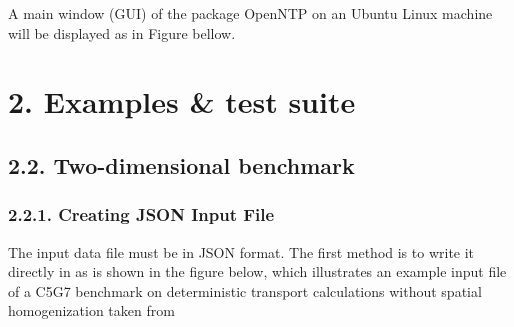 \documentclass[letterpaper,10pt,english]{sphinxmanual}
\begin{document}
A main window (GUI) of the package OpenNTP on an Ubuntu Linux machine will be displayed as in Figure bellow.

\noindent{}


\section{2. Examples \& test suite}
\label{\detokenize{Guide:examples-test-suite}}

\subsection{2.2. Two-dimensional benchmark}
\label{\detokenize{Guide:two-dimensional-benchmark}}

\subsubsection{2.2.1. Creating JSON Input File}
\label{\detokenize{Guide:creating-json-input-file}}
The input data file must be in JSON format. The first method is
to write it directly in   as is shown in the figure below, which illustrates an example input file of a C5G7 benchmark on deterministic transport calculations without spatial homogenization taken from 
\end{document}
